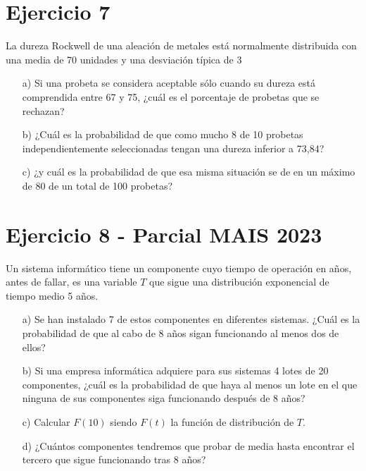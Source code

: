 \documentclass[fleqn]{article}
\begin{document}
	\section{Ejercicio 7}
	La dureza Rockwell de una aleación de metales está normalmente distribuida con una media de 70 unidades y una desviación típica de 3
	\begin{enumerate}
		\item[a)] Si una probeta se considera aceptable sólo cuando su dureza está comprendida entre 67 y 75, ¿cuál es el porcentaje de probetas que se rechazan?
		\item[b)] ¿Cuál es la probabilidad de que como mucho 8 de 10 probetas independientemente seleccionadas tengan una dureza inferior a 73,84?
		\item[c)] ¿y cuál es la probabilidad de que esa misma situación se de en un máximo de 80 de un total de 100 probetas?
	\end{enumerate}
	\section{Ejercicio 8 - Parcial MAIS 2023}
	Un sistema informático tiene un componente cuyo tiempo de operación en años, antes de fallar, es una variable $T$ que sigue una distribución exponencial de tiempo medio 5 años.
	\begin{enumerate}
		\item[a)] Se han instalado 7 de estos componentes en diferentes sistemas. ¿Cuál es la probabilidad de que al cabo de 8 años sigan funcionando al menos dos de ellos?
		\item[b)] Si una empresa informática adquiere para sus sistemas 4 lotes de 20 componentes, ¿cuál es la probabilidad de que haya al menos un lote en el que ninguna de sus componentes siga funcionando después de 8 años?
		\item[c)] Calcular $F(10)$ siendo $F(t)$ la función de distribución de $T$.
		\item[d)] ¿Cuántos componentes tendremos que probar de media hasta encontrar el tercero que sigue funcionando tras 8 años?
	\end{enumerate}
	
\end{document}
